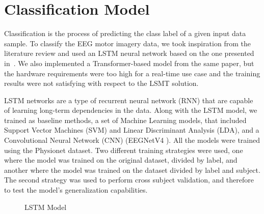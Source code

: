 \section{Classification Model}
Classification is the process of predicting the class label of a given input data sample.
To classify the EEG motor imagery data, we took inspiration from the literature review and used an LSTM neural network based on the one presented in~\cite{sharma_deep_2023}.
We also implemented a Transformer-based model from the same paper, but the hardware requirements were too high for a real-time use case and the training results were not satisfying with respect to the LSMT solution.

LSTM networks are a type of recurrent neural network (RNN) that are capable of learning long-term dependencies in the data.
Along with the LSTM model, we trained as baseline methods, a set of Machine Learning models, that included Support Vector Machines (SVM) and Linear Discriminant Analysis (LDA), and a Convolutional Neural Network (CNN) (EEGNetV4 \cite{lawhern2018eegnet}).
All the models were trained using the Physionet dataset. 
Two different training strategies were used, one where the model was trained on the original dataset, divided by label, and another where the model was trained on the dataset divided by label and subject.
The second strategy was used to perform cross subject validation, and therefore to test the model's generalization capabilities.
\begin{figure}[!htbp]
    \centering
    \caption{LSTM Model}
    \label{fig:lstm}
\end{figure}

